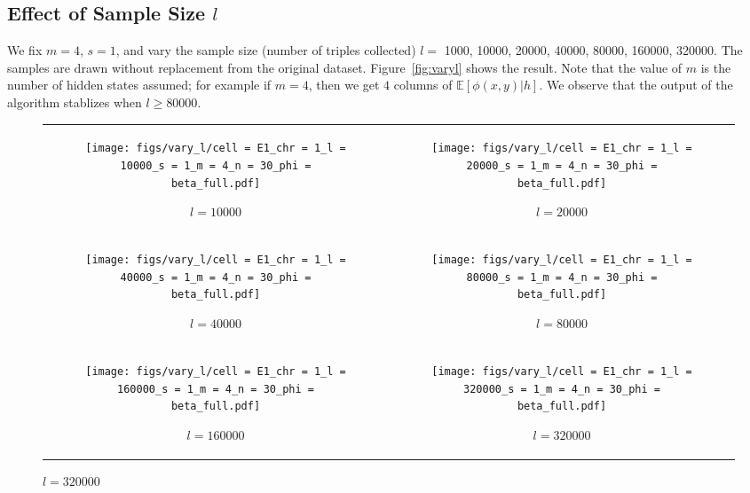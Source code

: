 \documentclass{article}
\def\E{\mathbb{E}}
\begin{document}
{\subsection{Effect of Sample Size $l$}
We fix $m = 4$, $s = 1$, and vary the sample size (number of triples collected) $l =$ 1000, 10000, 20000, 40000, 80000, 160000, 320000. The samples are drawn without replacement from the original dataset. Figure~\ref{fig:varyl} shows the result. Note that the value of $m$ is the number of hidden states assumed; for example if $m = 4$, then we get $4$ columns of $\E[\phi(x,y)|h]$. We observe that the output of the algorithm stablizes when $l \geq 80000$.

\begin{figure}[H]

    \begin{tabular}{cc}
    \begin{subfigure}[t]{0.45\textwidth}
        \texttt{[image: figs/vary\_l/cell = E1\_chr = 1\_l = 10000\_s = 1\_m = 4\_n = 30\_phi = beta\_full.pdf]}
        \caption{$l = 10000$}
    \end{subfigure}
    &
    \begin{subfigure}[t]{0.45\textwidth}
        \texttt{[image: figs/vary\_l/cell = E1\_chr = 1\_l = 20000\_s = 1\_m = 4\_n = 30\_phi = beta\_full.pdf]}
        \caption{$l = 20000$}
    \end{subfigure}
    \\
    \begin{subfigure}[t]{0.45\textwidth}
        \texttt{[image: figs/vary\_l/cell = E1\_chr = 1\_l = 40000\_s = 1\_m = 4\_n = 30\_phi = beta\_full.pdf]}
        \caption{$l = 40000$}
    \end{subfigure}
    &
    \begin{subfigure}[t]{0.45\textwidth}
        \texttt{[image: figs/vary\_l/cell = E1\_chr = 1\_l = 80000\_s = 1\_m = 4\_n = 30\_phi = beta\_full.pdf]}
        \caption{$l = 80000$}
    \end{subfigure}
    \\
    \begin{subfigure}[t]{0.45\textwidth}
        \texttt{[image: figs/vary\_l/cell = E1\_chr = 1\_l = 160000\_s = 1\_m = 4\_n = 30\_phi = beta\_full.pdf]}
        \caption{$l = 160000$}
    \end{subfigure}
    &
    \begin{subfigure}[t]{0.45\textwidth}
        \texttt{[image: figs/vary\_l/cell = E1\_chr = 1\_l = 320000\_s = 1\_m = 4\_n = 30\_phi = beta\_full.pdf]}
        \caption{$l = 320000$}
    \end{subfigure}
    \\
    \end{tabular}


\end{figure}}
\end{document}
